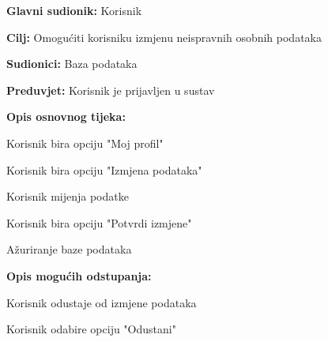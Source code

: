 					\noindent {}
					\begin{packed_item}
						
						\item \textbf{Glavni sudionik: }Korisnik
						\item  \textbf{Cilj:} Omogućiti korisniku izmjenu neispravnih osobnih podataka
						\item  \textbf{Sudionici:} Baza podataka
						\item  \textbf{Preduvjet:} Korisnik je prijavljen u sustav
						\item  \textbf{Opis osnovnog tijeka:}
						
						\item[] \begin{packed_enum}
							
							\item Korisnik bira opciju "Moj profil"
							\item Korisnik bira opciju "Izmjena podataka"
							\item Korisnik mijenja podatke
							\item Korisnik bira opciju "Potvrdi izmjene"
							\item Ažuriranje baze podataka
						\end{packed_enum}
						
						\item  \textbf{Opis mogućih odstupanja:}
						
						\item[] \begin{packed_item}
							
							\item[2.a] Korisnik odustaje od izmjene podataka
							\item[] \begin{packed_enum}
								
								\item Korisnik odabire opciju "Odustani"
							\end{packed_enum}
						\end{packed_item}
					\end{packed_item}
				
